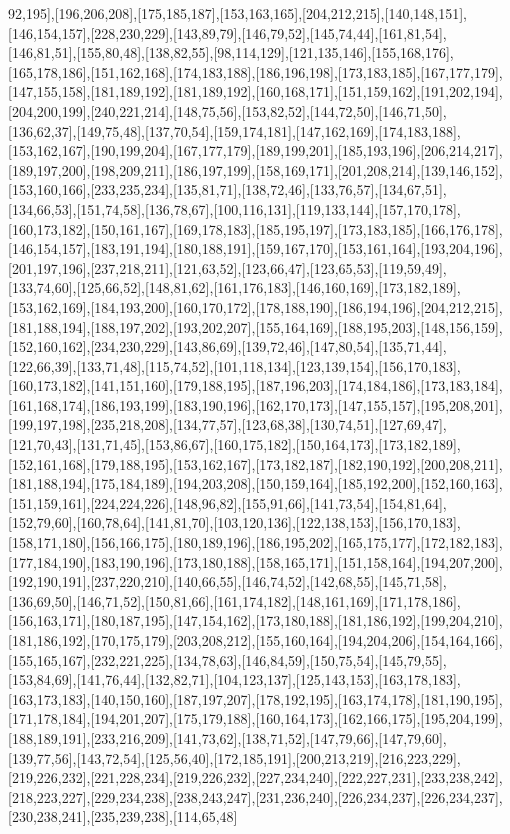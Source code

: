 92,195],[196,206,208],[175,185,187],[153,163,165],[204,212,215],[140,148,151],[146,154,157],[228,230,229],[143,89,79],[146,79,52],[145,74,44],[161,81,54],[146,81,51],[155,80,48],[138,82,55],[98,114,129],[121,135,146],[155,168,176],[165,178,186],[151,162,168],[174,183,188],[186,196,198],[173,183,185],[167,177,179],[147,155,158],[181,189,192],[181,189,192],[160,168,171],[151,159,162],[191,202,194],[204,200,199],[240,221,214],[148,75,56],[153,82,52],[144,72,50],[146,71,50],[136,62,37],[149,75,48],[137,70,54],[159,174,181],[147,162,169],[174,183,188],[153,162,167],[190,199,204],[167,177,179],[189,199,201],[185,193,196],[206,214,217],[189,197,200],[198,209,211],[186,197,199],[158,169,171],[201,208,214],[139,146,152],[153,160,166],[233,235,234],[135,81,71],[138,72,46],[133,76,57],[134,67,51],[134,66,53],[151,74,58],[136,78,67],[100,116,131],[119,133,144],[157,170,178],[160,173,182],[150,161,167],[169,178,183],[185,195,197],[173,183,185],[166,176,178],[146,154,157],[183,191,194],[180,188,191],[159,167,170],[153,161,164],[193,204,196],[201,197,196],[237,218,211],[121,63,52],[123,66,47],[123,65,53],[119,59,49],[133,74,60],[125,66,52],[148,81,62],[161,176,183],[146,160,169],[173,182,189],[153,162,169],[184,193,200],[160,170,172],[178,188,190],[186,194,196],[204,212,215],[181,188,194],[188,197,202],[193,202,207],[155,164,169],[188,195,203],[148,156,159],[152,160,162],[234,230,229],[143,86,69],[139,72,46],[147,80,54],[135,71,44],[122,66,39],[133,71,48],[115,74,52],[101,118,134],[123,139,154],[156,170,183],[160,173,182],[141,151,160],[179,188,195],[187,196,203],[174,184,186],[173,183,184],[161,168,174],[186,193,199],[183,190,196],[162,170,173],[147,155,157],[195,208,201],[199,197,198],[235,218,208],[134,77,57],[123,68,38],[130,74,51],[127,69,47],[121,70,43],[131,71,45],[153,86,67],[160,175,182],[150,164,173],[173,182,189],[152,161,168],[179,188,195],[153,162,167],[173,182,187],[182,190,192],[200,208,211],[181,188,194],[175,184,189],[194,203,208],[150,159,164],[185,192,200],[152,160,163],[151,159,161],[224,224,226],[148,96,82],[155,91,66],[141,73,54],[154,81,64],[152,79,60],[160,78,64],[141,81,70],[103,120,136],[122,138,153],[156,170,183],[158,171,180],[156,166,175],[180,189,196],[186,195,202],[165,175,177],[172,182,183],[177,184,190],[183,190,196],[173,180,188],[158,165,171],[151,158,164],[194,207,200],[192,190,191],[237,220,210],[140,66,55],[146,74,52],[142,68,55],[145,71,58],[136,69,50],[146,71,52],[150,81,66],[161,174,182],[148,161,169],[171,178,186],[156,163,171],[180,187,195],[147,154,162],[173,180,188],[181,186,192],[199,204,210],[181,186,192],[170,175,179],[203,208,212],[155,160,164],[194,204,206],[154,164,166],[155,165,167],[232,221,225],[134,78,63],[146,84,59],[150,75,54],[145,79,55],[153,84,69],[141,76,44],[132,82,71],[104,123,137],[125,143,153],[163,178,183],[163,173,183],[140,150,160],[187,197,207],[178,192,195],[163,174,178],[181,190,195],[171,178,184],[194,201,207],[175,179,188],[160,164,173],[162,166,175],[195,204,199],[188,189,191],[233,216,209],[141,73,62],[138,71,52],[147,79,66],[147,79,60],[139,77,56],[143,72,54],[125,56,40],[172,185,191],[200,213,219],[216,223,229],[219,226,232],[221,228,234],[219,226,232],[227,234,240],[222,227,231],[233,238,242],[218,223,227],[229,234,238],[238,243,247],[231,236,240],[226,234,237],[226,234,237],[230,238,241],[235,239,238],[114,65,48]